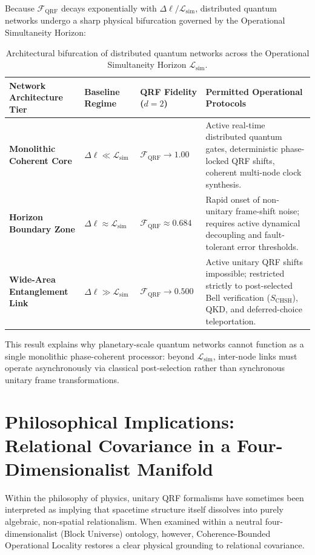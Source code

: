 \documentclass[11pt,a4paper]{article}
\begin{document}
Because $\mathcal{F}_{\mathrm{QRF}}$ decays exponentially with $\Delta\ell / \mathcal{L}_{\mathrm{sim}}$, distributed quantum networks undergo a sharp physical bifurcation governed by the Operational Simultaneity Horizon:

\begin{table}[h!]
\centering
\renewcommand{\arraystretch}{1.35}
\begin{tabular}{p{3.4cm} p{2.7cm} p{2.6cm} p{5.3cm}}
\toprule
\textbf{Network Architecture Tier} & \textbf{Baseline Regime} & \textbf{QRF Fidelity ($d=2$)} & \textbf{Permitted Operational Protocols} \\
\midrule
\textbf{Monolithic Coherent Core} & $\Delta\ell \ll \mathcal{L}_{\mathrm{sim}}$ & $\mathcal{F}_{\mathrm{QRF}} \to 1.00$ & Active real-time distributed quantum gates, deterministic phase-locked QRF shifts, coherent multi-node clock synthesis. \\
\textbf{Horizon Boundary Zone} & $\Delta\ell \approx \mathcal{L}_{\mathrm{sim}}$ & $\mathcal{F}_{\mathrm{QRF}} \approx 0.684$ & Rapid onset of non-unitary frame-shift noise; requires active dynamical decoupling and fault-tolerant error thresholds. \\
\textbf{Wide-Area Entanglement Link} & $\Delta\ell \gg \mathcal{L}_{\mathrm{sim}}$ & $\mathcal{F}_{\mathrm{QRF}} \to 0.500$ & Active unitary QRF shifts impossible; restricted strictly to post-selected Bell verification ($S_{\mathrm{CHSH}}$), QKD, and deferred-choice teleportation. \\
\bottomrule
\end{tabular}
\caption{Architectural bifurcation of distributed quantum networks across the Operational Simultaneity Horizon $\mathcal{L}_{\mathrm{sim}}$.}
\label{tab:network_tiers}
\end{table}

This result explains why planetary-scale quantum networks cannot function as a single monolithic phase-coherent processor: beyond $\mathcal{L}_{\mathrm{sim}}$, inter-node links must operate asynchronously via classical post-selection rather than synchronous unitary frame transformations.

\section{Philosophical Implications: Relational Covariance in a Four-Dimensionalist Manifold}

Within the philosophy of physics, unitary QRF formalisms have sometimes been interpreted as implying that spacetime structure itself dissolves into purely algebraic, non-spatial relationalism. When examined within a neutral four-dimensionalist (Block Universe) ontology, however, Coherence-Bounded Operational Locality restores a clear physical grounding to relational covariance.
\end{document}
